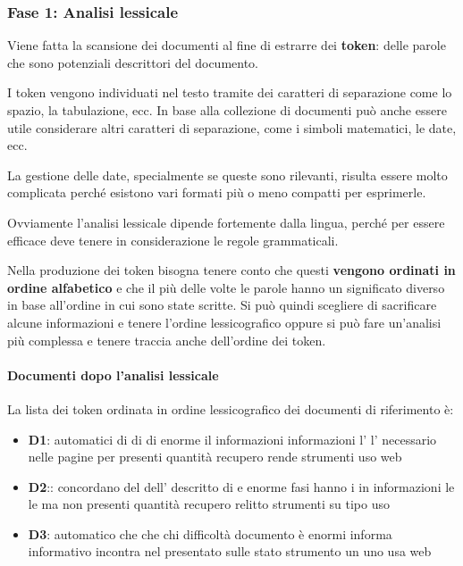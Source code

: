 \subsubsection{Fase 1: Analisi lessicale}

Viene fatta la scansione dei documenti al fine di estrarre dei \textbf{token}: delle parole che sono potenziali descrittori del documento.

I token vengono individuati nel testo tramite dei caratteri di separazione come lo spazio, la tabulazione, ecc. In base alla collezione di documenti può anche essere utile considerare altri caratteri di separazione, come i simboli matematici, le date, ecc.

La gestione delle date, specialmente se queste sono rilevanti, risulta essere molto complicata perché esistono vari formati più o meno compatti per esprimerle.

Ovviamente l'analisi lessicale dipende fortemente dalla lingua, perché per essere efficace deve tenere in considerazione le regole grammaticali.

Nella produzione dei token bisogna tenere conto che questi \textbf{vengono ordinati in ordine alfabetico} e che il più delle volte le parole hanno un significato diverso in base all'ordine in cui sono state scritte. 
Si può quindi scegliere di sacrificare alcune informazioni e tenere l'ordine lessicografico oppure si può fare un'analisi più complessa e tenere traccia anche dell'ordine dei token.

\paragraph{Documenti dopo l'analisi lessicale} La lista dei token ordinata in ordine lessicografico dei documenti di riferimento è:

\begin{itemize}
	\item \textbf{D1}: automatici di di di enorme il informazioni
	informazioni l' l' necessario nelle pagine per presenti quantità recupero rende strumenti uso web
	\item \textbf{D2}:: concordano del dell' descritto di e enorme fasi hanno i in informazioni le le ma non presenti quantità recupero relitto strumenti su tipo uso 
	\item \textbf{D3}: automatico che che chi difficoltà documento è enormi informa informativo incontra nel presentato sulle stato strumento un uno usa web 
\end{itemize}

